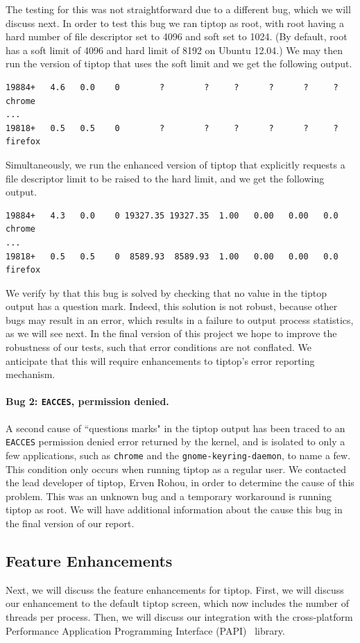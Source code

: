 The testing for this was not straightforward due to a different bug, which we will discuss next.
In order to test this bug we ran tiptop as root, with root having a hard number of file descriptor set to 4096 and soft set to 1024. (By default, root has a soft limit of 4096 and hard limit of 8192 on Ubuntu 12.04.)
We may then run the version of tiptop that uses the soft limit and we get the following output.
\begin{verbatim}
19884+   4.6   0.0    0        ?        ?     ?      ?      ?     ? chrome
...
19818+   0.5   0.5    0        ?        ?     ?      ?      ?     ? firefox
\end{verbatim}

Simultaneously, we run the enhanced version of tiptop that explicitly requests a file descriptor limit to be raised to the hard limit, and we get the following output.
\begin{verbatim}
19884+   4.3   0.0    0 19327.35 19327.35  1.00   0.00   0.00   0.0 chrome
...
19818+   0.5   0.5    0  8589.93  8589.93  1.00   0.00   0.00   0.0 firefox
\end{verbatim}

We verify by that this bug is solved by checking that no value in the tiptop output has a question mark. Indeed, this solution is not robust, because other bugs may result in an error, which results in a failure to output process statistics, as we will see next.
In the final version of this project we hope to improve the robustness of our tests, such that error conditions are not conflated. We anticipate that this will require enhancements to tiptop's error reporting mechanism.

\paragraph{Bug 2: \texttt{EACCES}, permission denied.}
A second cause of ``questions marks" in the tiptop output has been traced to an \texttt{EACCES} permission denied error returned by the kernel, and is isolated to only a few applications, such as \texttt{chrome} and the \texttt{gnome-keyring-daemon}, to name a few.
This condition only occurs when running tiptop as a regular user.
We contacted the lead developer of tiptop, Erven Rohou, in order to determine the cause of this problem.
This was an unknown bug and a temporary workaround is running tiptop as root.
We will have additional information about the cause this bug in the final version of our report.

\subsection{Feature Enhancements}
Next, we will discuss the feature enhancements for tiptop.
First, we will discuss our enhancement to the default tiptop screen, which now includes the number of threads per process.
Then, we will discuss our integration with the cross-platform Performance Application Programming Interface (PAPI)~\cite{xxx} library.

